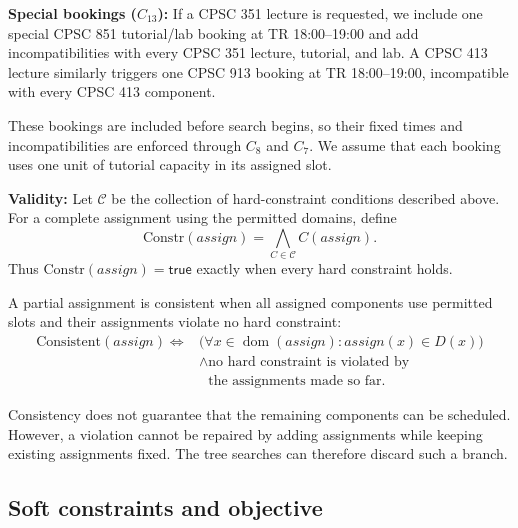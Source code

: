 \textbf{Special bookings ($C_{13}$):}
If a CPSC 351 lecture is requested, we include one special
CPSC 851 tutorial/lab booking at TR 18:00--19:00 and add
incompatibilities with every CPSC 351 lecture, tutorial,
and lab. A CPSC 413 lecture similarly triggers one CPSC 913
booking at TR 18:00--19:00, incompatible with every
CPSC 413 component.

These bookings are included before search begins, so their
fixed times and incompatibilities are enforced through
$C_8$ and $C_7$. We assume that each booking uses one unit
of tutorial capacity in its assigned slot.

\textbf{Validity:}
Let $\mathcal C$ be the collection of hard-constraint
conditions described above. For a complete assignment
using the permitted domains, define
\begin{equation}
\mathrm{Constr}(\mathit{assign})
=\bigwedge_{C\in\mathcal C}C(\mathit{assign}).
\label{eq:const}
\end{equation}
Thus $\mathrm{Constr}(\mathit{assign})=\mathsf{true}$
exactly when every hard constraint holds.

A partial assignment is consistent when all assigned
components use permitted slots and their assignments
violate no hard constraint:
\begin{equation}
\begin{aligned}
\mathrm{Consistent}(\mathit{assign})\iff{}&
\bigl(\forall x\in\operatorname{dom}(\mathit{assign}):
      \mathit{assign}(x)\in D(x)\bigr)\\
&{}\land\text{no hard constraint is violated by}\\
&\phantom{{}\land{}}\text{the assignments made so far.}
\end{aligned}
\label{eq:consistent}
\end{equation}

Consistency does not guarantee that the remaining components
can be scheduled. However, a violation cannot be repaired
by adding assignments while keeping existing assignments
fixed. The tree searches can therefore discard such a branch.

\subsection{Soft constraints and objective}
\label{sec:soft}

